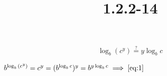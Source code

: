 \documentclass{article}
\title{1.2.2-14}
\begin{document}
\maketitle

\[\log_b(c^y) \overset{?}{=} y \log_b c \tag{1}\label{eq:1}\]

$b^{\log_b{(c^y)}} = c^y = (b^{\log_b{c}})^y = b^{y \log_b{c}} \implies \eqref{eq:1}$
\end{document}
